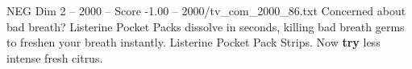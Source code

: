 \begin{textsample}{NEG Dim 2 – 2000 – Score -1.00 – 2000/tv\_com\_2000\_86.txt}  \label{ex:f2_neg_015}
Concerned about bad breath?
Listerine Pocket Packs dissolve in seconds, killing bad breath germs to freshen your breath instantly.
Listerine Pocket Pack Strips.
Now \textbf{try} less intense fresh citrus.

\end{textsample}
